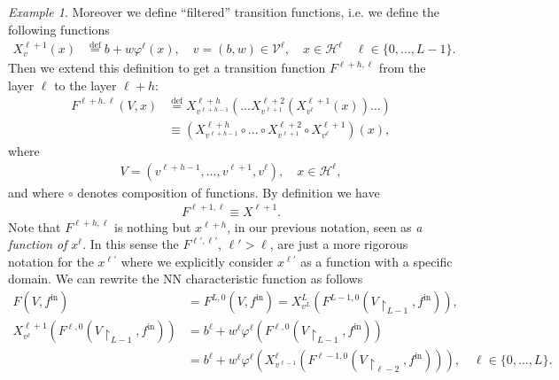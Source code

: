 \documentclass[10pt, a4paper]{article}
\theoremstyle{plain}
\theoremstyle{definition}
\theoremstyle{definition}
\theoremstyle{definition}
\theoremstyle{definition}
\theoremstyle{definition}
\theoremstyle{definition}
\theoremstyle{definition}
\theoremstyle{remark}
\theoremstyle{remark}
\newtheorem{example}[theorem]{Example}
\theoremstyle{rudin-style-generic}
\theoremstyle{rudin-style-generic*}
\theoremstyle{rudin-style-theorem}
\newcommand{\deq}{\stackrel{\mathrm{def}}{=}}
\newcommand*{\rest}{{\upharpoonright}} %
\begin{document}
\begin{example}
  
  Moreover we define ``filtered'' transition functions, i.e. we define the following functions
  \begin{align*}
    X^{\ell+1}_{v}(x) &\deq b + w\varphi^\ell(x),
                            \quad v=(b,w)\in\mathcal V^\ell,
                            \quad x\in\mathcal H^\ell
                            \quad \ell\in \{0,\dots, L-1\}
                            .
  \end{align*}
  Then we extend this definition to get a transition function $F^{\ell+h,\ell}$ from the layer $\ell$ to the layer $\ell+h$:
  \begin{align*}
    F^{\ell+h,\ell}(V, x) &\deq X^{\ell+h}_{v^{\ell+h-1}}  (\dots  X^{\ell+2}_{v^{\ell+1}} ( X^{\ell+1} _{v^{\ell}} (x) ) \dots ) \\
                       &\equiv (X^{\ell+h}_{v^{\ell+h-1}} \circ \dots \circ X^{\ell+2}_{v^{\ell+1}}  \circ X^{\ell+1}_{v^{\ell}}  )(x)
                         ,
  \end{align*}
  where
  \begin{align*}
    V = (v^{\ell+h-1},\dots,v^{\ell+1}, v^{\ell} ) , \quad x\in\mathcal H^\ell
    ,
  \end{align*}
  and  where $\circ$ denotes composition of functions.
  By definition we have
  \begin{align*}
    F^{\ell+1,\ell} \equiv X^{\ell+1}
    .
  \end{align*}
  Note that $F^{\ell+h,\ell}$ is nothing but $x^{\ell+h}$, in our previous notation, seen as \textit{a function of} $x^{\ell}$.
  In this sense the $F^{\ell',\ell'}$, $\ell'>\ell$, are just a more rigorous notation for the $x^{\ell'}$ where we explicitly consider $x^{\ell'}$
  as a function with  a specific domain.
  We can rewrite the NN characteristic function as follows
  \begin{align*}
    F(V,f^{\text{in}}) &= F^{L,0}(V, f^{\text{in}})  = X^{L}_{v^L}(  F^{L-1,0}(V\rest_{L-1},  f^{\text{in}} ) ), \\
    X^{\ell+1}_{v^\ell}( F^{\ell,0}(V\rest_{L-1}, f^{\text{in}} ) )
                       &= b^\ell + w^\ell \varphi^\ell( F^{\ell,0}(V\rest_{L-1}, f^{\text{in}}) )\\
                       &=  b^\ell + w^\ell  \varphi^\ell ( X^{\ell}_{v^{\ell-1}} ( F^{\ell-1,0}(V\rest_{\ell-2}, f^{\text{in}})) ),
                         \quad \ell\in\{0,\dots, L\} 
                         .
  \end{align*}


\end{example}
\end{document}
